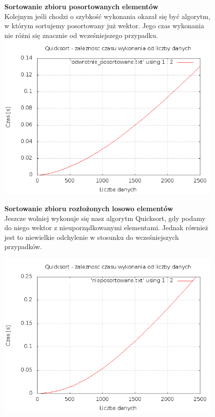 \documentclass[a4paper,11pt]{report}
\begin{document}
\begin{figure}
  \begin{center}
  \textbf{Sortowanie zbioru posortowanych elementów}
\\Kolejnym jeśli chodzi o szybkość wykonania okazał się być algorytm, w którym sortujemy posortowany już wektor. Jego czas wykonania nie różni się znacznie od wcześniejszego przypadku.
\\
\includegraphics[scale=0.5]{./posortowane.png}
  \end{center}
\end{figure}

\begin{figure}
  \begin{center}
  \textbf{Sortowanie zbioru rozłożonych losowo elementów}
\\
Jeszcze wolniej wykonuje się nasz algorytm Quicksort, gdy podamy do niego wektor z nieuporządkowanymi elementami. Jednak również jest to niewielkie odchylenie w stosunku do wcześniejszych przypadków.

    \includegraphics[scale=0.5]{./nieposortowane.png}
    \label{fig:}
  \end{center}
\end{figure}
\end{document}
